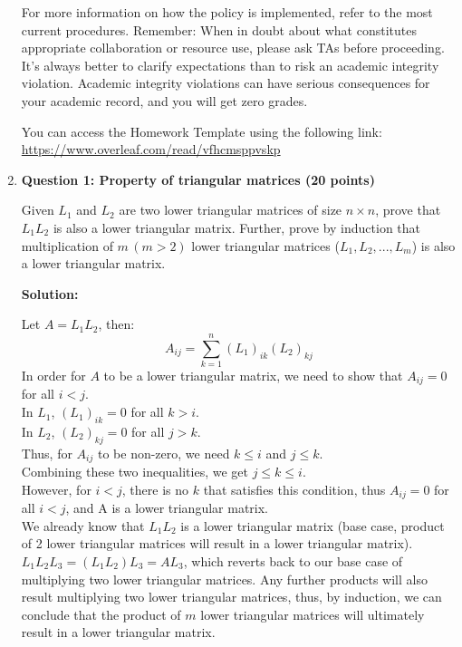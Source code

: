 \documentclass[11pt,letterpaper]{article}
\begin{document}
\begin{enumerate}
{\begin{minipage}{0.95\textwidth}
\begin{enumerate}
    For more information on how the policy is implemented, refer to the most current procedures. Remember: When in doubt about what constitutes appropriate collaboration or resource use, please ask TAs before proceeding. It's always better to clarify expectations than to risk an academic integrity violation. Academic integrity violations can have serious consequences for your academic record, and you will get zero grades.
\end{enumerate}



You can access the Homework Template using the following link: \url{https://www.overleaf.com/read/vfhcmsppvskp}
\end{minipage}}

\clearpage
\item[] \textbf{Question 1: Property of triangular matrices (20 points)} 

Given $L_1$ and $L_2$ are two lower triangular matrices of size $n\times n$, prove that $L_1L_2$ is also a lower triangular matrix. Further, prove by induction that multiplication of $m\,(m>2)$ lower triangular matrices ($L_1, L_2,..., L_m$) is also a lower triangular matrix.

\textbf{Solution:}  

Let $A = L_1L_2$, then:
\[
A_{ij} = \sum_{k=1}^{n} (L_1)_{ik} (L_2)_{kj}
\]
In order for $A$ to be a lower triangular matrix, we need to show that $A_{ij} = 0$ 
for all $i < j$.\\
In $L_1$, $(L_1)_{ik} = 0$ for all $k > i$.\\
In $L_2$, $(L_2)_{kj} = 0$ for all $j > k$.\\
Thus, for $A_{ij}$ to be non-zero, we need $k \leq i$ and $j \leq k$.\\
Combining these two inequalities, we get $j \leq k \leq i$.\\
However, for $i < j$, there is no $k$ that satisfies this condition, thus $A_{ij} = 0$ 
for all $i < j$, and A is a lower triangular matrix.\\

We already know that $L_1L_2$ is a lower triangular matrix (base case, product 
of 2 lower triangular matrices will result in a lower triangular matrix). $L_1L_2L_3 = (L_1L_2)L_3 = AL_3$,
which reverts back to our base case of multiplying two lower triangular matrices.
Any further products will also result multiplying two lower triangular matrices, 
thus, by induction, we can conclude that the product of $m$ lower triangular 
matrices will ultimately result in a lower triangular matrix. 


\end{enumerate}
\end{document}
